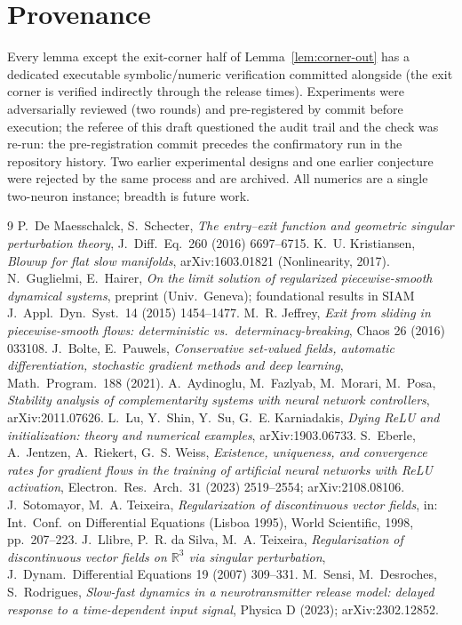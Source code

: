 \documentclass[11pt]{article}
\begin{document}
\section*{Provenance}
Every lemma except the exit-corner half of Lemma~\ref{lem:corner-out} has a
dedicated executable symbolic/numeric verification committed alongside (the
exit corner is verified indirectly through the release times). Experiments were
adversarially reviewed (two rounds) and pre-registered by commit before
execution; the referee of this draft questioned the audit trail and the check
was re-run: the pre-registration commit precedes the confirmatory run in the
repository history. Two earlier experimental designs and one earlier conjecture
were rejected by the same process and are archived. All numerics are a single
two-neuron instance; breadth is future work.

\begin{thebibliography}{9}
 P.~De Maesschalck, S.~Schecter, \emph{The entry--exit function
and geometric singular perturbation theory}, J.~Diff.~Eq.\ 260 (2016) 6697--6715.
 K.~U. Kristiansen, \emph{Blowup for flat slow manifolds},
arXiv:1603.01821 (Nonlinearity, 2017).
 N.~Guglielmi, E.~Hairer, \emph{On the limit solution of regularized
piecewise-smooth dynamical systems}, preprint (Univ.\ Geneva); foundational
results in SIAM J.~Appl.~Dyn.~Syst.\ 14 (2015) 1454--1477.
 M.~R. Jeffrey, \emph{Exit from sliding in piecewise-smooth
flows: deterministic vs.\ determinacy-breaking}, Chaos 26 (2016) 033108.
 J.~Bolte, E.~Pauwels, \emph{Conservative set-valued fields,
automatic differentiation, stochastic gradient methods and deep learning},
Math.~Program.\ 188 (2021).
 A.~Aydinoglu, M.~Fazlyab, M.~Morari, M.~Posa, \emph{Stability
analysis of complementarity systems with neural network controllers},
arXiv:2011.07626.
 L.~Lu, Y.~Shin, Y.~Su, G.~E. Karniadakis, \emph{Dying ReLU and
initialization: theory and numerical examples}, arXiv:1903.06733.
 S.~Eberle, A.~Jentzen, A.~Riekert, G.~S. Weiss,
\emph{Existence, uniqueness, and convergence rates for gradient flows in the
training of artificial neural networks with ReLU activation},
Electron.~Res.~Arch.\ 31 (2023) 2519--2554; arXiv:2108.08106.
 J.~Sotomayor, M.~A. Teixeira, \emph{Regularization of
discontinuous vector fields}, in: Int.\ Conf.\ on Differential Equations
(Lisboa 1995), World Scientific, 1998, pp.~207--223.
 J.~Llibre, P.~R. da Silva, M.~A. Teixeira, \emph{Regularization
of discontinuous vector fields on $\mathbb{R}^3$ via singular perturbation},
J.~Dynam.~Differential Equations 19 (2007) 309--331.
 M.~Sensi, M.~Desroches, S.~Rodrigues, \emph{Slow-fast dynamics
in a neurotransmitter release model: delayed response to a time-dependent input
signal}, Physica D (2023); arXiv:2302.12852.
\end{thebibliography}
\end{document}
